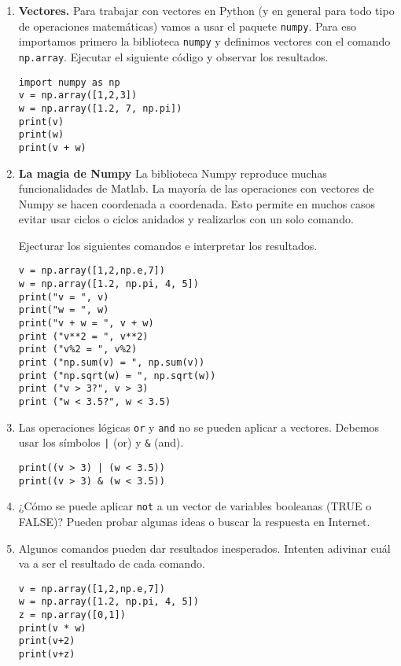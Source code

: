 \documentclass[a4paper,11pt]{article}
\theoremstyle{definition}
\begin{document}
\begin{enumerate}
\item \textbf{Vectores.}
Para trabajar con vectores en Python (y en general para todo tipo de operaciones matemáticas) vamos a usar el paquete \lstinline{numpy}. Para eso importamos primero la biblioteca \lstinline{numpy} y definimos vectores con el comando \lstinline{np.array}. Ejecutar el siguiente c\'odigo y observar los resultados.

\begin{lstlisting}
import numpy as np
v = np.array([1,2,3])
w = np.array([1.2, 7, np.pi])
print(v)
print(w)
print(v + w)
\end{lstlisting}

\item \textbf{La magia de Numpy} La biblioteca Numpy reproduce muchas funcionalidades de Matlab. La mayor\'ia de las operaciones con vectores de Numpy se hacen coordenada a coordenada. Esto permite en muchos casos evitar usar ciclos o ciclos anidados y realizarlos con un solo comando.

Ejecturar los siguientes comandos e interpretar los resultados.

\begin{lstlisting}
v = np.array([1,2,np.e,7])
w = np.array([1.2, np.pi, 4, 5])
print("v = ", v)
print("w = ", w)
print("v + w = ", v + w)
print ("v**2 = ", v**2)
print ("v%2 = ", v%2)
print ("np.sum(v) = ", np.sum(v))
print ("np.sqrt(w) = ", np.sqrt(w))
print ("v > 3?", v > 3)
print ("w < 3.5?", w < 3.5)
\end{lstlisting}

\item Las operaciones l\'ogicas \lstinline{or} y \lstinline{and} no se pueden aplicar a vectores. Debemos usar los s\'imbolos \lstinline{|} (or) y \lstinline{&} (and).
\begin{lstlisting}
print((v > 3) | (w < 3.5))
print((v > 3) & (w < 3.5))
\end{lstlisting}

\item ¿C\'omo se puede aplicar \lstinline{not} a un vector de variables booleanas (TRUE o FALSE)? Pueden probar algunas ideas o buscar la respuesta en Internet.

\item Algunos comandos pueden dar resultados inesperados. Intenten adivinar cuál va a ser el resultado de cada comando.
\begin{lstlisting}
v = np.array([1,2,np.e,7])
w = np.array([1.2, np.pi, 4, 5])
z = np.array([0,1])
print(v * w)
print(v+2)
print(v+z)
\end{lstlisting}


\end{enumerate}
\end{document}
